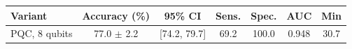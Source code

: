 \begin{tabular}{lcccccc}
\toprule
Variant & Accuracy (\%) & 95\% CI & Sens. & Spec. & AUC & Min \\
\midrule
PQC, 8 qubits & 77.0 $\pm$ 2.2 & [74.2, 79.7] & 69.2 & 100.0 & 0.948 & 30.7 \\
\bottomrule
\end{tabular}